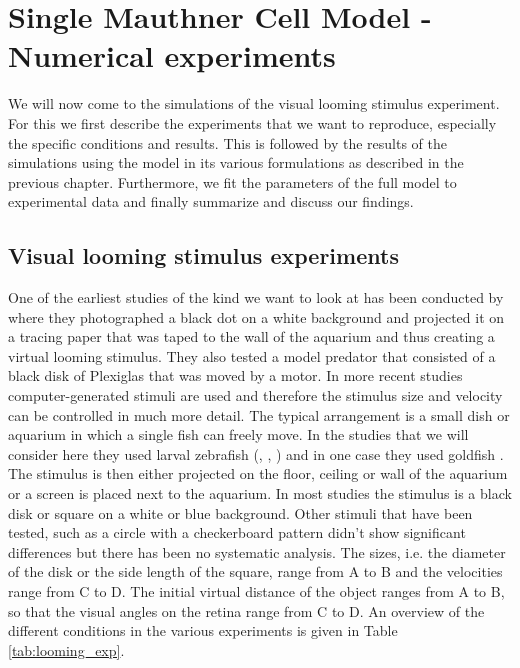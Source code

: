\documentclass[a4paper,10pt,hidelinks]{scrreprt}
\begin{document}
	\chapter{Single Mauthner Cell Model - Numerical experiments}
	We will now come to the simulations of the visual looming stimulus experiment.
	For this we first describe the experiments that we want to reproduce, especially the specific 
	conditions and results.
	This is followed by the results of the simulations using the model in its various formulations 
	as described in the previous chapter.
	Furthermore, we fit the parameters of the full model to experimental data and finally summarize 
	and discuss our findings.
	\section{Visual looming stimulus experiments}
	One of the earliest studies of the kind we want to look at has been conducted by 
	\citep{Dill1974} where they photographed a black dot on a white background and projected it on 
	a tracing paper that was taped to the wall of the aquarium and thus creating a virtual looming 
	stimulus.
	They also tested a model predator that consisted of a black disk of Plexiglas that was moved by 
	a motor.
	In more recent studies computer-generated stimuli are used and therefore the stimulus size 
	and velocity can be controlled in much more detail.
	The typical arrangement is a small dish or aquarium in which a single fish can freely move. 
	In the studies that we will consider here they used larval zebrafish (\cite{Temizer2015}, 
	\cite{Dunn2016}, \cite{Bhattacharyya2017}) and in one case they used goldfish 
	\citep{Preuss2006}.
	The stimulus is then either projected on the floor, ceiling or wall of the aquarium or a screen 
	is placed next to the aquarium.
	In most studies the stimulus is a black disk or square on a white or blue background.
	Other stimuli that have been tested, such as a circle with a checkerboard pattern didn't show 
	significant differences but there has been no systematic analysis.
	The sizes, i.e. the diameter of the disk or the side length of the square, range from A to B 
	and the velocities range from C to D. %
	The initial virtual distance of the object ranges from A to B, so that the visual angles on the 
	retina range from C to D. %
	An overview of the different conditions in the various experiments is given in Table 
	\ref{tab:looming_exp}.\\
\end{document}

